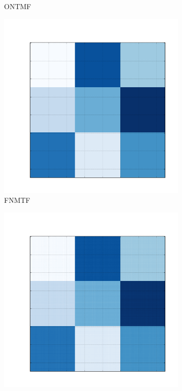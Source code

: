 \documentclass[10pt]{beamer}
\begin{document}
\begin{frame}
\begin{figure}[H]
\begin{subfigure}[b]{0.13\textwidth}
          \caption*{ONTMF}
      \end{subfigure}
      \begin{subfigure}[b]{0.13\textwidth}
          \includegraphics[width=\textwidth]{img/c-reconstruction-fnmtf.png}
          \caption*{FNMTF}
      \end{subfigure}
      \begin{subfigure}[b]{0.13\textwidth}
          \includegraphics[width=\textwidth]{img/c-reconstruction-ovnmtf.png}

\end{subfigure}
\end{figure}
\end{frame}
\end{document}
